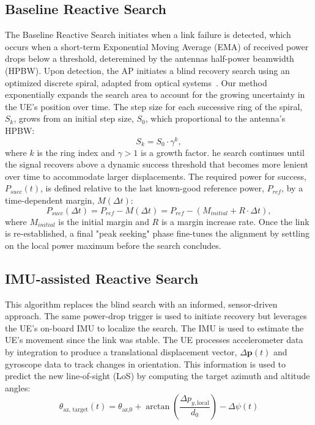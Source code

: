 \documentclass[fleqn,10pt]{wlscirep}
\begin{document}
\subsection*{Baseline Reactive Search}
The Baseline Reactive Search initiates when a link failure is detected, which occurs when a short-term Exponential Moving Average (EMA) of received power drops below a threshold, deteremined by the antennas half-power beamwidth (HPBW).
Upon detection, the AP initiates a blind recovery search using an optimized discrete spiral, adapted from optical systems~\cite{photonics11060540}. Our method exponentially expands the search area to account for the growing uncertainty in the UE's position over time. The step size for each successive ring of the spiral, $S_k$, grows from an initial step size, $S_0$, which proportional to the antenna's HPBW:
\begin{equation}
    S_k = S_0 \cdot \gamma^k,
\end{equation}
where $k$ is the ring index and $\gamma > 1$ is a growth factor.
he search continues until the signal recovers above a dynamic success threshold that becomes more lenient over time to accommodate larger displacements. The required power for success, $P_{succ}(t)$, is defined relative to the last known-good reference power, $P_{ref}$, by a time-dependent margin, $M(\Delta t)$:
\begin{equation}
    P_{succ}(\Delta t) = P_{ref} - M(\Delta t) = P_{ref} - (M_{initial} + R \cdot \Delta t),
\end{equation}
where $M_{initial}$ is the initial margin and $R$ is a margin increase rate. Once the link is re-established, a final "peak seeking" phase fine-tunes the alignment by settling on the local power maximum before the search concludes.

\subsection*{IMU-assisted Reactive Search}

This algorithm replaces the blind search with an informed, sensor-driven approach. The same power-drop trigger is used to initiate recovery but leverages the UE's on-board IMU to localize the search. The IMU is used to estimate the UE's movement since the link was stable. The UE processes accelerometer data by integration to produce a translational displacement vector, $\Delta\mathbf{p}(t)$ and gyroscope data to track changes in orientation. This information is used to predict the new line-of-sight (LoS) by computing the target azimuth and altitude angles: 
\begin{equation}
    \theta_{\text{az, target}}(t) = \theta_{\text{az,0}} + \arctan\left(\frac{\Delta p_{y, \text{local}}}{d_0}\right) - \Delta\psi(t)
\end{equation}
\end{document}
